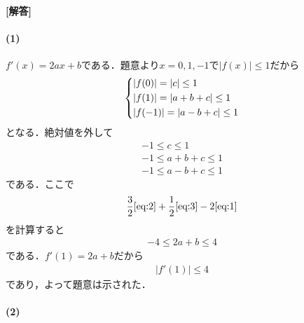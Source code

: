 \documentclass[../../main.tex]{subfiles}
\begin{document}
\begin{oframed}
  
\end{oframed}

{\bf [解答]}
\paragraph{(1)}
$f'(x)=2ax+b$である．題意より$x=0,1,-1$で$|f(x)|\le 1$だから
\begin{align}
  \begin{dcases}
    |f(0)| = |c| \le 1 \\
    |f(1)| = |a+b+c| \le 1 \\
    |f(-1)| = |a-b+c| \le 1
  \end{dcases}
\end{align}
となる．絶対値を外して
\begin{align}
  -1 \le c \le 1 \label{eq:1}\\
  -1 \le a+b+c \le 1 \label{eq:2}\\
  -1 \le a-b+c \le 1 \label{eq:3}
\end{align}
である．ここで
\begin{align}
  \dfrac{3}{2}\text{\cref{eq:2}} + \dfrac{1}{2}\text{\cref{eq:3}} - 2\text{\cref{eq:1}} \label{eq:4}
\end{align}
を計算すると
\begin{align}
  -4 \le 2a + b \le 4
\end{align}
である．$f'(1)=2a+b$だから
\begin{align}
  |f'(1)| \le 4
\end{align}
であり，よって題意は示された．


\paragraph{(2)}
\end{document}
